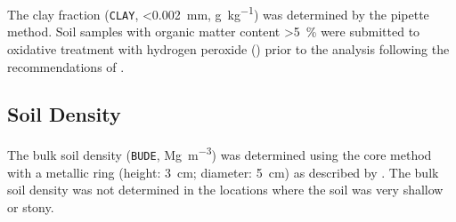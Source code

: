 
The clay fraction (\texttt{CLAY}, \SI{<0.002}{\milli\metre}, \si{\gram\per\kilo\gram}) was determined by the 
pipette method. Soil samples with organic matter content \SI{>5}{\percent} were submitted to oxidative 
treatment with hydrogen peroxide () prior to the analysis following the recommendations of
.

%



\subsection{Soil Density}
\label{chap:chap04-bude}

The bulk soil density (\texttt{BUDE}, \si{\mega\gram\per\cubic\metre}) was determined using the core method 
with a metallic ring (height: \SI{3}{\centi\metre}; diameter: \SI{5}{\centi\metre}) as described by 
. The bulk soil density was not determined in the locations where the soil was 
very shallow or stony.

